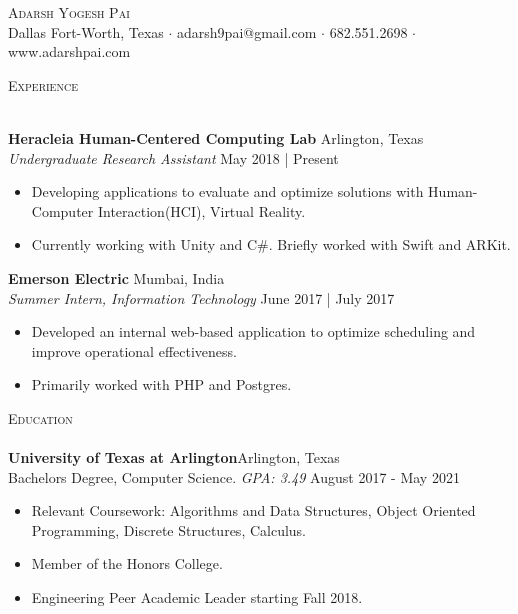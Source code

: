 \documentclass[a4paper]{article}
\newcommand{\lineunder} {
    \vspace*{-8pt} \\
    \hspace*{-18pt} \hrulefill \\
}
\newcommand{\header} [1] {
    {\hspace*{-18pt}\vspace*{6pt} \textsc{#1}}
    \vspace*{-6pt} \lineunder
}
\begin{document}
\vspace*{-40pt}

    


\vspace*{-10pt}
\begin{center}
	{\Huge \scshape {Adarsh Yogesh Pai}}\\
	Dallas Fort-Worth, Texas $\cdot$ adarsh9pai@gmail.com $\cdot$ 682.551.2698 $\cdot$ www.adarshpai.com\\
\end{center}

\header{Experience}
\vspace{1mm}

\textbf{Heracleia Human-Centered Computing Lab} \hfill Arlington, Texas\\
\textit{Undergraduate Research Assistant} \hfill May 2018 | Present\\
\vspace{-1mm}
\begin{itemize} \itemsep 1pt
	\item Developing applications to evaluate and optimize solutions with Human-Computer Interaction(HCI), Virtual Reality.  
    \item Currently working with Unity and C\#. Briefly worked with Swift and ARKit.
\end{itemize}

\textbf{Emerson Electric} \hfill Mumbai, India\\
\textit{Summer Intern, Information Technology} \hfill June 2017 | July 2017\\
\vspace{-1mm}
\begin{itemize} \itemsep 1pt
	\item Developed an internal web-based application to optimize scheduling and improve operational effectiveness.
	\item Primarily worked with PHP and Postgres.
\end{itemize}


\header{Education}
\textbf{University of Texas at Arlington}\hfill Arlington, Texas\\
Bachelor\textquotesingle{}s Degree, Computer Science. \textit{GPA: 3.49} \hfill August 2017 - May 2021\\

\begin{itemize} \itemsep 1pt
	\item Relevant Coursework: Algorithms and Data Structures, Object Oriented Programming, Discrete Structures, Calculus.
	\item Member of the Honors College.
    \item Engineering Peer Academic Leader starting Fall 2018.
\end{itemize}
\vspace{2mm}
\end{document}
